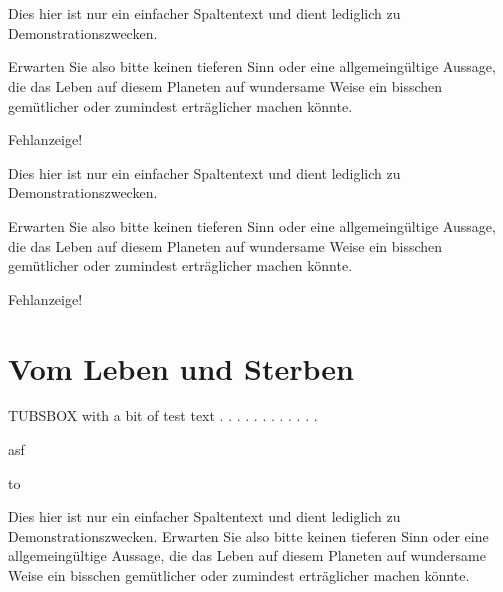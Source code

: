 \documentclass[a4paper,portrait]{scrreprt}
\newcommand{\tubsohead}[1]{\ohead{%
\parbox[t][\headheight]{3cm}{%
\raggedleft #1%
}%
}}%
\begin{document}


\tubsohead{\pagename~\pagemark}
~



\newpage \ClearShipoutPicture

~
\begin{tubsbox}{0}{1}{1}{8}\footnotesize
  Dies hier ist nur ein einfacher Spaltentext und dient lediglich zu Demonstrationszwecken.
  
  Erwarten Sie also bitte keinen tieferen Sinn oder eine allgemeingültige Aussage, die das Leben auf diesem Planeten auf wundersame Weise ein bisschen gemütlicher oder zumindest erträglicher machen könnte.
  
  Fehlanzeige!
\end{tubsbox}
\begin{tubsbox}{1}{1}{5}{2}
 Dies hier ist nur ein einfacher Spaltentext und dient lediglich zu Demonstrationszwecken.
  
  Erwarten Sie also bitte keinen tieferen Sinn oder eine allgemeingültige Aussage, die das Leben auf diesem Planeten auf wundersame Weise ein bisschen gemütlicher oder zumindest erträglicher machen könnte.
  
  Fehlanzeige!
  \chapter{Vom Leben und Sterben}
  TUBSBOX with a bit of test text . . . . . . . . . . . .
\end{tubsbox}
\begin{tubsbox}[tuBlue20]{1}{3}{5}{2}
asf
\end{tubsbox}

\newpage

\setlength{\fboxsep}{0cm}%
\colorbox{tuSecondaryLight}{%
\parbox{\textwidth}{\vbox to }%
}


\newpage

 Dies hier ist nur ein einfacher Spaltentext und dient lediglich zu Demonstrationszwecken.
  Erwarten Sie also bitte keinen tieferen Sinn oder eine allgemeingültige Aussage, die das Leben auf diesem Planeten auf wundersame Weise ein bisschen gemütlicher oder zumindest erträglicher machen könnte.
  
\end{document}
